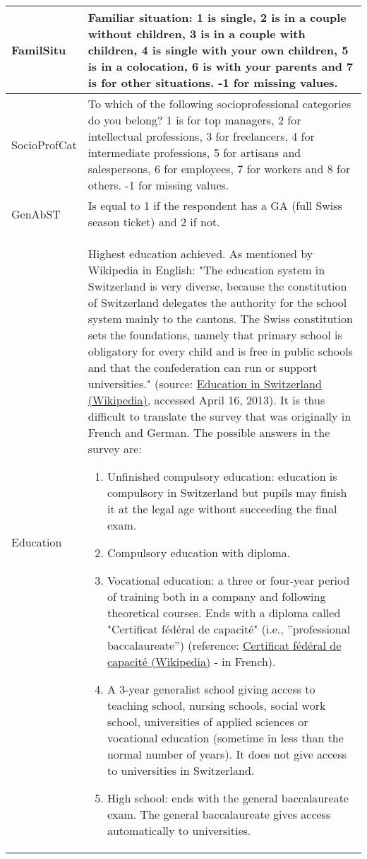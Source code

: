 \documentclass[12pt,a4paper]{article}
\begin{document}
\begin{longtable}{p{4cm}|p{10.5cm}}
		\hline
		FamilSitu & Familiar situation: 1 is single, 2 is in a couple without children, 3 is in a couple with children, 4 is single with your own children, 5 is in a colocation, 6 is with your parents and 7 is for other situations. -1 for missing values.\tabularnewline
		\hline
		SocioProfCat & To which of the following socioprofessional categories do you belong? 1 is for top managers, 2 for intellectual professions, 3 for freelancers, 4 for intermediate professions, 5 for artisans and salespersons, 6 for employees, 7 for workers and 8 for others. -1 for missing values.\tabularnewline
		\hline 
		GenAbST & Is equal to 1 if the respondent has a GA (full Swiss season ticket) and 2 if not.\tabularnewline
		\hline
		Education &Highest education achieved. As mentioned by Wikipedia in English: "The education system in Switzerland is very diverse, because the constitution of Switzerland delegates the authority for the school system mainly to the cantons. The Swiss constitution sets the foundations, namely that primary school is obligatory for every child and is free in public schools and that the confederation can run or support universities." (source: \href{http://en.wikipedia.org/wiki/Education\_in\_Switzerland}{Education in Switzerland (Wikipedia)}, accessed April 16, 2013). It is thus difficult to translate the survey that was originally in French and German. The possible answers in the survey are:
		\begin{enumerate}
			\item Unfinished compulsory education: education is compulsory in Switzerland but pupils may finish it at the legal age without succeeding the final exam.
			\item Compulsory education with diploma.
			\item Vocational education: a three or four-year period of training both in a company and following theoretical courses. Ends with a diploma called "Certificat fédéral de capacité" (i.e., ''professional baccalaureate'') (reference: \href{https://fr.wikipedia.org/wiki/Certificat\_f\%C3\%A9d\%C3\%A9ral\_de\_capacit\%C3\%A9}{Certificat fédéral de capacité (Wikipedia)} - in French).
			\item A 3-year generalist school giving access to teaching school, nursing schools, social work school, universities of applied sciences or vocational education (sometime in less than the normal number of years). It does not give access to universities in Switzerland.
			\item High school: ends with the general baccalaureate exam. The general baccalaureate gives access automatically to universities.

\end{enumerate}
\end{longtable}
\end{document}
